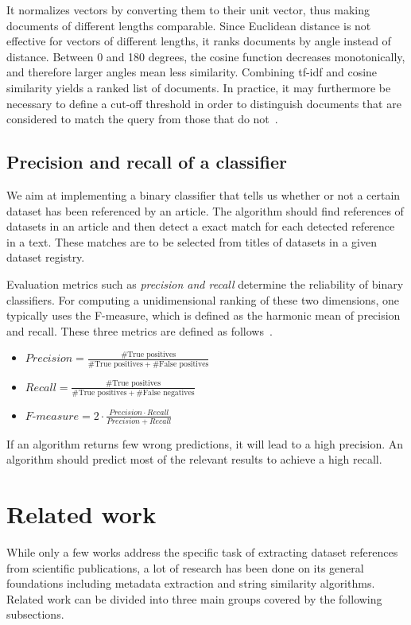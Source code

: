 \documentclass{IOS-Book-Article}
\begin{document}
It normalizes vectors by converting them to their unit vector, thus making documents of different lengths comparable.
Since Euclidean distance is not effective for vectors of different lengths, it ranks documents by angle instead of distance.
Between 0 and 180 degrees, the cosine function decreases monotonically, and therefore larger angles mean less similarity.
Combining tf-idf and cosine similarity yields a ranked list of documents.
In practice, it may furthermore be necessary to define a cut-off threshold in order to distinguish documents that are considered to match the query from those that do not~\citep{Joachims1997}.

\subsection{Precision and recall of a classifier}
\label{sec:precision-recall}
We aim at implementing a binary classifier that tells us whether or not a certain dataset has been referenced by an article.
The algorithm should find references of datasets in an article and then detect a exact match for each detected reference in a text.
These matches are to be selected from titles of datasets in a given dataset registry.

Evaluation metrics such as \emph{precision and recall} determine the reliability of binary classifiers.
For computing a unidimensional ranking of these two dimensions, one typically uses the F-measure, which is defined as the harmonic mean of precision and recall. 
These three metrics are defined as follows~\cite{Powers2011}. 
\begin{itemize}
	\item $\mathit{Precision}=\frac{\#\text{True\ positives}}{\#\text{True positives}+\#\text{False positives}}$
	\item $\mathit{Recall}=\frac{\#\text{True positives}}{\#\text{True positives}+\#\text{False negatives}}$
	\item $\textit{F-measure}=2\cdot{\frac{\mathit{Precision}\cdot\mathit{Recall}}{\mathit{Precision}+\mathit{Recall}}}$
\end{itemize}

If an algorithm returns few wrong predictions, it will lead to a high precision.
An algorithm should predict most of the relevant results to achieve a high recall.


\section{Related work}
\label{sec:relWork}
While only a few works address the specific task of extracting dataset references from scientific publications, a lot of research has been done on its general foundations including metadata extraction and string similarity algorithms. 
Related work can be divided into three main groups covered by the following subsections.
\end{document}
